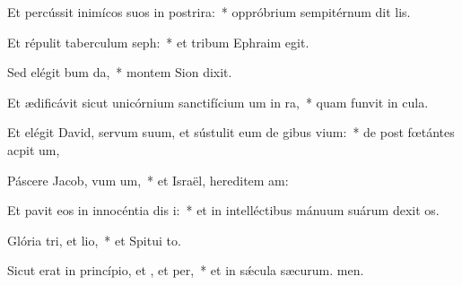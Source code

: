 \item Et percússit inimícos suos in postrira:~* oppróbrium sempitérnum dit lis.
\item Et répulit taberculum seph:~* et tribum Ephraim  egit.
\item Sed elégit bum da,~* montem Sion  dixit.
\item Et ædificávit sicut unicórnium sanctifícium um in ra,~* quam funvit in cula.
\item Et elégit David, servum suum, et sústulit eum de gibus vium:~* de post fœtántes acpit um,
\item Páscere Jacob, vum um,~* et Israël, hereditem am:
\item Et pavit eos in innocéntia dis i:~* et in intelléctibus mánuum suárum dexit os.
\item Glória tri, et lio,~* et Spitui to.
\item Sicut erat in princípio, et , et per,~* et in sǽcula sæcurum. men.
